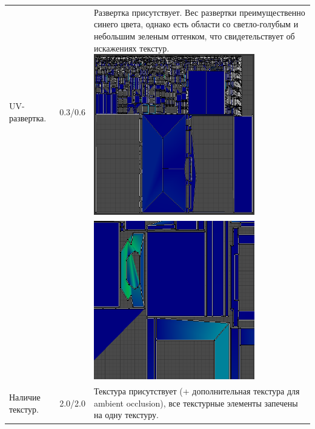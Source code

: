 \begin{longtable}{|p{4cm}|p{2.5cm}|p{7.5cm}|}
    \hline
    UV-развертка. & 0.3/0.6 & Развертка присутствует. Вес развертки преимущественно синего цвета, однако есть области со светло-голубым и небольшим зеленым оттенком, что свидетельствует об искажениях текстур.
    \includegraphics[width=7cm]{src/uv_13}\\
    & & \includegraphics[width=7cm]{src/uv_14}\\
    \hline
    Наличие текстур. & 2.0/2.0 & Текстура присутствует (+ дополнительная текстура для ambient occlusion), все текстурные элементы запечены на одну текстуру. 


\end{longtable}
